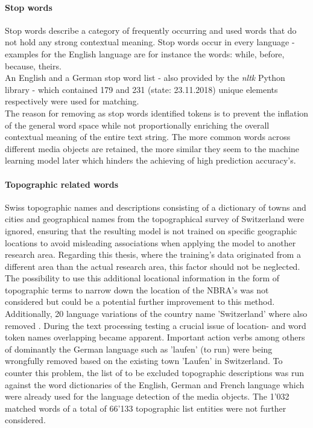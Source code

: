 \paragraph*{Stop words}
Stop words describe a category of frequently occurring and used words that do not hold any strong contextual meaning. Stop words occur in every language - examples for the English language are for instance the words: while, before, because, theirs.\\
An English and a German stop word list - also provided by the \textit{nltk} Python library - which contained 179 and 231 (state: 23.11.2018) unique elements respectively were used for matching.\\
\newline
The reason for removing as stop words identified tokens is to prevent the inflation of the general word space while not proportionally enriching the overall contextual meaning of the entire text string. The more common words across different media objects are retained, the more similar they seem to the machine learning model later which hinders the achieving of high prediction accuracy's.

\paragraph*{Topographic related words}
Swiss topographic names and descriptions consisting of a dictionary of towns and cities \parencite{Swisstopo2018O} and geographical names from the topographical survey of Switzerland \parencite{Swisstopo2018a} were ignored, ensuring that the resulting model is not trained on  specific geographic locations to avoid misleading associations when applying the model to another research area. Regarding this thesis, where the training's data originated from a different area than the actual research area, this factor should not be neglected. 
The possibility to use this additional locational information in the form of topographic terms to narrow down the location of the NBRA's was not considered but could be a potential further improvement to this method. 
Additionally, 20 language variations of the country name 'Switzerland' where also removed \parencite{101languages2018}. 
During the text processing testing a crucial issue of location- and word token names overlapping became apparent. Important action verbs among others of dominantly the German language such as 'laufen' (to run) were being wrongfully removed based on the existing town 'Laufen' in Switzerland. To counter this problem, the list of to be excluded topographic descriptions was run against the word dictionaries of the English, German and French language which were already used for the language detection of the media objects. The 1'032 matched words of a total of 66'133 topographic list entities were not further considered.

